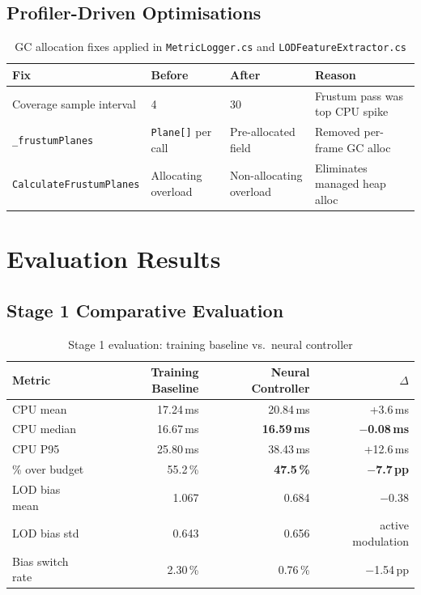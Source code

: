 \documentclass[12pt, a4paper]{article}
\begin{document}
\subsection{Profiler-Driven Optimisations}

\begin{table}[H]
\centering
\caption{GC allocation fixes applied in \texttt{MetricLogger.cs} and
  \texttt{LODFeatureExtractor.cs}}
\label{tab:gcfixes}
\begin{tabular}{l l l p{4cm}}
\toprule
Fix & Before & After & Reason\\
\midrule
Coverage sample interval & 4 & 30 & Frustum pass was top CPU spike\\
\texttt{\_frustumPlanes} & \texttt{Plane[]} per call & Pre-allocated field & Removed per-frame GC alloc\\
\texttt{CalculateFrustumPlanes} & Allocating overload & Non-allocating overload & Eliminates managed heap alloc\\
\bottomrule
\end{tabular}
\end{table}

\section{Evaluation Results}
\label{sec:eval}

\subsection{Stage 1 Comparative Evaluation}

\begin{table}[H]
\centering
\caption{Stage 1 evaluation: training baseline vs.\ neural controller}
\label{tab:s1eval}
\begin{tabular}{l r r r}
\toprule
Metric & Training Baseline & Neural Controller & $\Delta$\\
\midrule
CPU mean & 17.24\,ms & 20.84\,ms & +3.6\,ms\\
CPU median & 16.67\,ms & \textbf{16.59\,ms} & \textbf{$-$0.08\,ms}\\
CPU P95 & 25.80\,ms & 38.43\,ms & +12.6\,ms\\
\% over budget & 55.2\,\% & \textbf{47.5\,\%} & \textbf{$-$7.7\,pp}\\
LOD bias mean & 1.067 & 0.684 & $-$0.38\\
LOD bias std & 0.643 & 0.656 & active modulation\\
Bias switch rate & 2.30\,\% & 0.76\,\% & $-$1.54\,pp\\
\bottomrule
\end{tabular}
\end{table}
\end{document}
